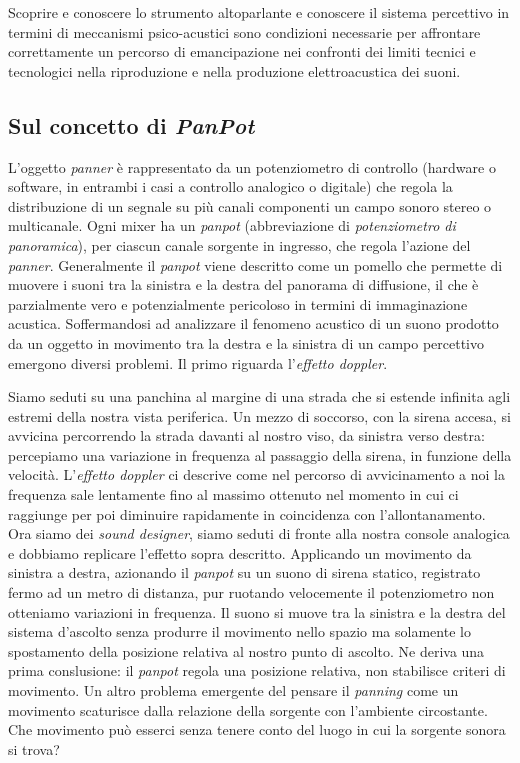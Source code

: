 Scoprire e conoscere lo strumento altoparlante e conoscere il sistema percettivo
in termini di meccanismi psico-acustici sono condizioni necessarie per
affrontare correttamente un percorso di emancipazione nei confronti dei limiti
tecnici e tecnologici nella riproduzione e nella produzione elettroacustica dei suoni.

\subsection{Sul concetto di \emph{PanPot}}
\label{sec:panpot}

L'oggetto \emph{panner} è rappresentato da un potenziometro di controllo
(hardware o software, in entrambi i casi a controllo analogico o digitale) che
regola la distribuzione di un segnale su più canali componenti un campo sonoro
stereo o multicanale. Ogni mixer ha un \emph{panpot} (abbreviazione di
\emph{potenziometro di panoramica}), per ciascun canale sorgente in ingresso,
che regola l'azione del \emph{panner}. Generalmente il \emph{panpot} viene descritto come un pomello che permette di
muovere i suoni tra la sinistra e la destra del panorama di diffusione, il che è
parzialmente vero e potenzialmente pericoloso in termini di immaginazione
acustica. Soffermandosi ad analizzare il fenomeno acustico di un suono prodotto da un
oggetto in movimento tra la destra e la sinistra di un campo percettivo emergono
diversi problemi. Il primo riguarda l'\emph{effetto doppler}.

Siamo seduti su una panchina al
margine di una strada che si estende infinita agli estremi della nostra vista
periferica. Un mezzo di soccorso, con la sirena accesa, si avvicina percorrendo
la strada davanti al nostro viso, da sinistra verso destra: percepiamo
una variazione in frequenza al passaggio della sirena, in funzione della
velocità. L'\emph{effetto doppler} ci descrive come nel percorso di
avvicinamento a noi la frequenza sale lentamente fino al massimo ottenuto nel
momento in cui ci raggiunge per poi diminuire rapidamente in coincidenza con
l'allontanamento. Ora siamo dei \emph{sound designer}, siamo seduti di fronte alla nostra console
analogica e dobbiamo replicare l'effetto sopra descritto. Applicando un
movimento da sinistra a destra, azionando il \emph{panpot} su un suono di sirena
statico, registrato fermo ad un metro di distanza, pur ruotando velocemente il
potenziometro non otteniamo variazioni in frequenza. Il suono si muove tra la
sinistra e la destra del sistema d'ascolto senza produrre il movimento nello
spazio ma solamente lo spostamento della posizione relativa al nostro punto di
ascolto. Ne deriva una prima conslusione: il \emph{panpot} regola una posizione
relativa, non stabilisce criteri di movimento. Un altro problema emergente del
pensare il \emph{panning} come un movimento
scaturisce dalla relazione della sorgente con l'ambiente circostante. Che
movimento può esserci senza tenere conto del luogo in cui la sorgente sonora si
trova?

